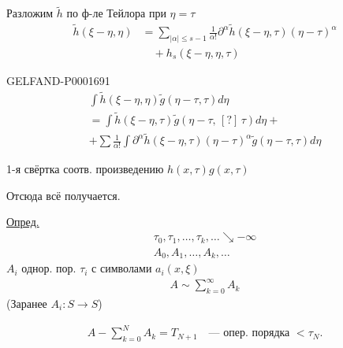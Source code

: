Разложим $\widetilde h$ по ф-ле Тейлора при $\eta=\tau$
\begin{equation*}
\begin{aligned}
\widetilde h(\xi-\eta,\eta)&=
\sum_{|\alpha|\leq s-1}\frac{1}{\alpha!}
\partial^\alpha\widetilde h(\xi-\eta,\tau)(\eta-\tau)^\alpha\\
&\quad+h_s(\xi-\eta,\eta,\tau)
\end{aligned}
\end{equation*}



\begin{GelfandAdjacentEvidence}{GELFAND-P000169}{1}
\begin{gather*}
\int\widetilde h(\xi-\eta,\eta)\widetilde g(\eta-\tau,\tau)d\eta\\
=\int\widetilde h(\xi-\eta,\tau)\widetilde g(\eta-\tau,\,[?]\,\tau)d\eta+\\
+\sum\frac{1}{\alpha!}\int\partial^\alpha\widetilde h(\xi-\eta,\tau)
(\eta-\tau)^\alpha\widetilde g(\eta-\tau,\tau)d\eta
\end{gather*}

\end{GelfandAdjacentEvidence}

\hfill{}


1-я свёртка соотв. произведению $h(x,\tau)g(x,\tau)$

Отсюда всё получается.


\underline{Опред.}
\begin{gather*}
\tau_0,\tau_1,\ldots,\tau_k,\ldots\searrow-\infty\\
A_0,A_1,\ldots,A_k,\ldots
\end{gather*}
$A_i$ однор. пор. $\tau_i$ с символами $a_i(x,\xi)$
\begin{gather*}
A\sim\sum_{k=0}^{\infty}A_k
\end{gather*}
(Заранее $A_i:S\longrightarrow S$)

\begin{gather*}
A-\sum_{k=0}^{N}A_k=T_{N+1}\quad\text{— опер. порядка }<\tau_N.
\end{gather*}

